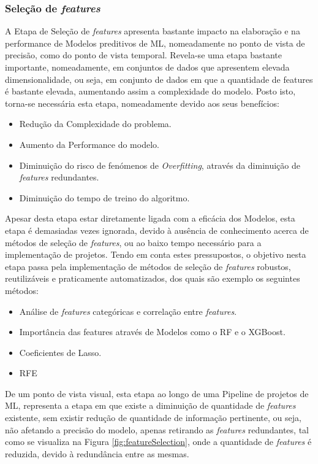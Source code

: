 \documentclass[12pt,a4paper,twoside]{report}
\begin{document}
{\subsubsection{Seleção de \textit{features}}

A Etapa de Seleção de \textit{features} apresenta bastante impacto na elaboração e na performance de Modelos preditivos de \gls{ML}, nomeadamente no ponto de vista de precisão, como do ponto de vista temporal. Revela-se uma etapa bastante importante, nomeadamente, em conjuntos de dados que apresentem elevada dimensionalidade, ou seja, em conjunto de dados em que a quantidade de features é bastante elevada, aumentando assim a complexidade do modelo. Posto isto, torna-se necessária esta etapa, nomeadamente devido aos seus benefícios:
\begin{itemize}
    \item Redução da Complexidade do problema.
    \item Aumento da Performance do modelo.
    \item Diminuição do risco de fenómenos de \textit{Overfitting}, através da diminuição de \textit{features} redundantes.
    \item Diminuição do tempo de treino do algoritmo.
\end{itemize}

Apesar desta etapa estar diretamente ligada com a eficácia dos Modelos, esta etapa é demasiadas vezes ignorada, devido à ausência de conhecimento acerca de métodos de seleção de \textit{features}, ou ao baixo tempo necessário para a implementação de projetos. Tendo em conta estes pressupostos, o objetivo nesta etapa passa pela implementação de métodos de seleção de \textit{features} robustos, reutilizáveis e praticamente automatizados, dos quais são exemplo os seguintes métodos:
\begin{itemize}
    \item Análise de \textit{features} categóricas e correlação entre \textit{features}.
    \item Importância das features através de Modelos como o \gls{RF} e o \Gls{XGBoost}.
    \item Coeficientes de Lasso.
    \item \gls{RFE}
\end{itemize}

De um ponto de vista visual, esta etapa ao longo de uma Pipeline de projetos de \gls{ML}, representa a etapa em que existe a diminuição de quantidade de \textit{features} existente, sem existir redução de quantidade de informação pertinente, ou seja, não afetando a precisão do modelo, apenas retirando as \textit{features} redundantes, tal como se visualiza na Figura \ref{fig:featureSelection}, onde a quantidade de \textit{features} é reduzida, devido à redundância entre as mesmas.

}
\end{document}
